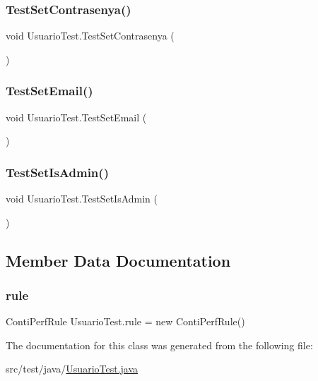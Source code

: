 \mbox{\label{class_usuario_test_ae54ab8d6508da5377f7b40a9df5865ff}} 
\subsubsection{\texorpdfstring{TestSetContrasenya()}{TestSetContrasenya()}}
{\footnotesize\ttfamily void Usuario\+Test.\+Test\+Set\+Contrasenya (\begin{DoxyParamCaption}{ }\end{DoxyParamCaption})}

\mbox{\label{class_usuario_test_afaeecf0b39295c30dfb136b4e6dbbb29}} 
\subsubsection{\texorpdfstring{TestSetEmail()}{TestSetEmail()}}
{\footnotesize\ttfamily void Usuario\+Test.\+Test\+Set\+Email (\begin{DoxyParamCaption}{ }\end{DoxyParamCaption})}

\mbox{\label{class_usuario_test_aee4f852120d2d90c77aba4e21edb0ad6}} 
\subsubsection{\texorpdfstring{TestSetIsAdmin()}{TestSetIsAdmin()}}
{\footnotesize\ttfamily void Usuario\+Test.\+Test\+Set\+Is\+Admin (\begin{DoxyParamCaption}{ }\end{DoxyParamCaption})}



\subsection{Member Data Documentation}
\mbox{\label{class_usuario_test_ab80cbde6eaaf783c116fdafdaa07bde9}} 
\subsubsection{\texorpdfstring{rule}{rule}}
{\footnotesize\ttfamily Conti\+Perf\+Rule Usuario\+Test.\+rule = new Conti\+Perf\+Rule()}



The documentation for this class was generated from the following file\+:\begin{DoxyCompactItemize}
\item 
src/test/java/\mbox{\hyperlink{_usuario_test_8java}{Usuario\+Test.\+java}}\end{DoxyCompactItemize}
